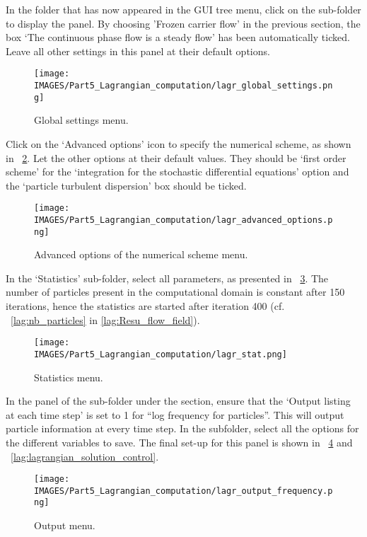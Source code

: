 In the  folder that has now appeared in the GUI tree menu, click on the sub-folder  to display the panel.  By choosing 'Frozen carrier flow' in the previous section, the box ‘The continuous phase flow is a steady flow’ has been automatically ticked.  Leave all other settings in this panel at their default options.
%
\begin{figure}[H]
\centering
\texttt{[image: \\IMAGES/Part5\_Lagrangian\_computation/lagr\_global\_settings.png]}
\caption{Global settings menu.}\label{lag:global_setting}
\end{figure}
%
Click on the ‘Advanced options’ icon to specify the numerical scheme, as shown in \figurename~\ref{lag:advanced_option}.  Let the other options at their default values. They should be ‘first order scheme’ for the ‘integration for the stochastic differential equations’ option and the ‘particle turbulent dispersion’ box should be ticked.
%
\begin{figure}[H]
\centering
\texttt{[image: \\IMAGES/Part5\_Lagrangian\_computation/lagr\_advanced\_options.png]}
\caption{Advanced options of the numerical scheme menu.}\label{lag:advanced_option}
\end{figure}
%
In the ‘Statistics’ sub-folder, select all parameters, as presented in \figurename~\ref{lag:statistics_menu}.  The number of particles present in the computational domain is constant after 150 iterations, hence the statistics are started after iteration 400 (cf. \figurename~\ref{lag:nb_particles} in \ref{lag:Resu_flow_field}).
%
\begin{figure}[H]
\centering
\texttt{[image: \\IMAGES/Part5\_Lagrangian\_computation/lagr\_stat.png]}
\caption{Statistics menu.}\label{lag:statistics_menu}
\end{figure}
%
In the panel of the  sub-folder under the  section, ensure that the ‘Output listing at each time step’ is set to 1 for ``log frequency for particles''.  This will output particle information at every time step. In the  subfolder, select all the options for the different variables to save.  The final set-up for this panel is shown in \figurename~\ref{lag:output_menu} and \figurename~\ref{lag:lagrangian_solution_control}.

\begin{figure}[H]
\centering
\texttt{[image: \\IMAGES/Part5\_Lagrangian\_computation/lagr\_output\_frequency.png]}
\caption{Output menu.}\label{lag:output_menu}
\end{figure}

